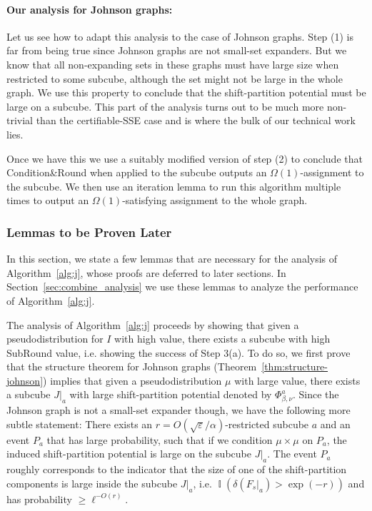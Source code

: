 \documentclass[11pt]{article}
\DeclareMathOperator*{\Ind}{\mathbb{I}}
\newcommand\skipi{{\vskip 10pt}}
\def \eps {{\varepsilon}}
\theoremstyle{definition}
\begin{document}
\paragraph{Our analysis for Johnson graphs:} 
Let us see how to adapt this analysis to the case of Johnson graphs. Step (1) is far from being true since Johnson graphs are not small-set expanders. But we know that all non-expanding sets in these graphs must have large size when restricted to some subcube, although the set might not be large in the whole graph. We use this property to conclude that the shift-partition potential must be large on a subcube. This part of the analysis turns out to be much more non-trivial than the certifiable-SSE case and is where the bulk of our technical work lies. 

Once we have this we use a suitably modified version of step (2) to conclude that Condition\&Round when applied to the subcube outputs an $\Omega(1)$-assignment to the subcube. We then use an iteration lemma to run this algorithm multiple times to output an $\Omega(1)$-satisfying assignment to the whole graph. 




\subsubsection{Lemmas to be Proven Later}
In this section, we state a few lemmas that are necessary for the analysis of 
Algorithm~\ref{alg:j}, whose proofs are deferred to later sections. In Section~\ref{sec:combine_analysis} we 
use these lemmas to analyze the performance 
of Algorithm~\ref{alg:j}.
\skipi

The analysis of Algorithm~\ref{alg:j} proceeds by showing that given a pseudodistribution for $I$ with high value, there exists a subcube with high SubRound value, i.e. showing the success of Step 3(a). To do so, we first prove that the structure theorem for Johnson graphs (Theorem~\ref{thm:structure-johnson}) implies that given a pseudodistribution $\mu$ with large value, there exists a subcube $J|_a$ with large shift-partition potential denoted by $\Phi^a_{\beta,\nu}$. Since the Johnson graph is not a small-set expander though, we have the following more subtle statement: There exists an $r = O(\sqrt{\eps}/\alpha)$-restricted subcube $a$ and an event $P_a$ that has large probability, such that if we condition $\mu \times \mu$ on $P_a$, the induced shift-partition potential is large on the subcube $J|_a$. The event $P_a$ roughly corresponds to the indicator that the size of one of the shift-partition components is large inside the subcube $J|_a$, i.e. $\Ind(\delta(F_s|_a) > \exp(-r))$ and has probability $\geq \ell^{-O(r)}$.  
\end{document}
